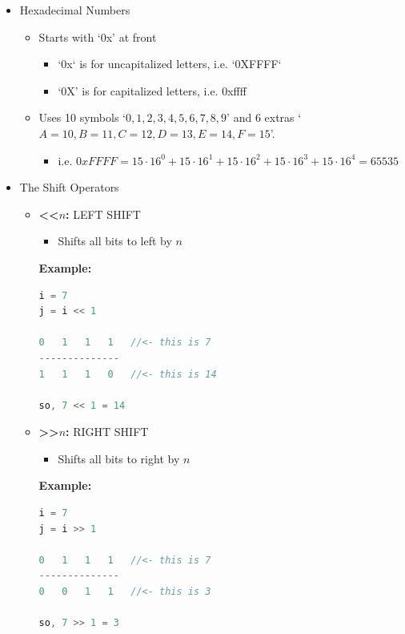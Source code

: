 \documentclass[12pt]{article}
\begin{document}
\begin{itemize}
    \item Hexadecimal Numbers
    \begin{itemize}
        \item Starts with `0x' at front
        \begin{itemize}
            \item `0x` is for uncapitalized letters, i.e. `0XFFFF`
            \item `0X' is for capitalized letters, i.e. 0xffff
        \end{itemize}
        \item Uses 10 symbols `$0,1,2,3,4,5,6,7,8,9$' and 6 extras `$A = 10, B = 11, C = 12, D = 13, E = 14, F = 15$'.
        \begin{itemize}
            \item i.e. $0xFFFF =  15 \cdot 16^0 + 15 \cdot 16^1 + 15 \cdot 16^2 + 15 \cdot 16^3 + 15 \cdot 16^4 = 65535$
        \end{itemize}
    \end{itemize}
    \item The Shift Operators
    \begin{itemize}
        \item \textbf{\textless\textless $n$:} LEFT SHIFT

        \begin{itemize}
            \item Shifts all bits to left by $n$
        \end{itemize}

        \bigskip

        \textbf{Example:}

        \bigskip

\begin{lstlisting}[language=c]
i = 7
j = i << 1

0   1   1   1   //<- this is 7
--------------
1   1   1   0   //<- this is 14

so, 7 << 1 = 14
\end{lstlisting}

        \item \textbf{\textgreater\textgreater $n$:} RIGHT SHIFT
        \begin{itemize}
            \item Shifts all bits to right by $n$
        \end{itemize}

        \bigskip

        \textbf{Example:}

        \bigskip

\begin{lstlisting}[language=c]
i = 7
j = i >> 1

0   1   1   1   //<- this is 7
--------------
0   0   1   1   //<- this is 3

so, 7 >> 1 = 3
\end{lstlisting}
    \end{itemize}
\end{itemize}
\end{document}
